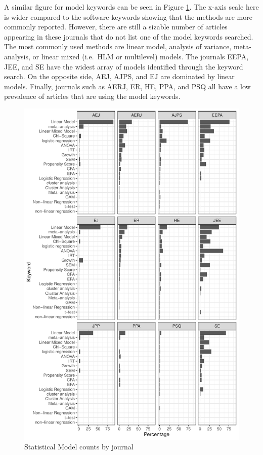 \documentclass[english,,man]{apa6}
\begin{document}
A similar figure for model keywords can be seen in Figure \ref{fig:model-journal}. The x-axis scale here is wider compared to the software keywords showing that the methods are more commonly reported. However, there are still a sizable number of articles appearing in these journals that do not list one of the model keywords searched. The most commonly used methods are linear model, analysis of variance, meta-analysis, or linear mixed (i.e.~HLM or multilevel) models. The journals EEPA, JEE, and SE have the widest array of models identified through the keyword search. On the opposite side, AEJ, AJPS, and EJ are dominated by linear models. Finally, journals such as AERJ, ER, HE, PPA, and PSQ all have a low prevalence of articles that are using the model keywords.

\begin{figure}
\centering
\includegraphics{software_files/figure-latex/model-journal-1.pdf}
\caption{\label{fig:model-journal}Statistical Model counts by journal}
\end{figure}
\end{document}

